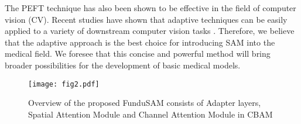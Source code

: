 The PEFT technique has also been shown to be effective in the field of computer vision (CV). Recent studies have shown that adaptive techniques can be easily applied to a variety of downstream computer vision tasks \cite{article} \cite{chen2022adaptformeradaptingvisiontransformers}. Therefore, we believe that the adaptive approach is the best choice for introducing SAM into the medical field. We foresee that this concise and powerful method will bring broader possibilities for the development of basic medical models.

\begin{figure*}[!t]
    \centering
    \texttt{[image: fig2.pdf]}
\caption{Overview of the proposed FunduSAM consists of Adapter layers, Spatial Attention Module and Channel Attention Module in CBAM}
    \label{fig2_framework}
\end{figure*}